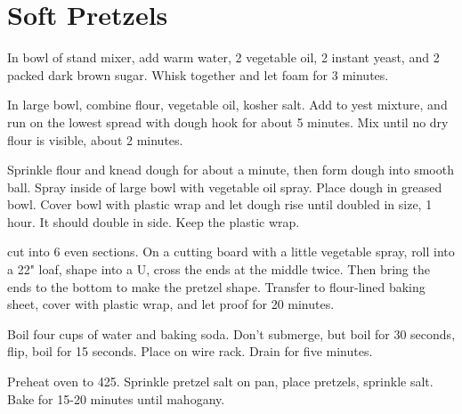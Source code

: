\section{Soft Pretzels}
\begin{recipe}



 In bowl of stand mixer, add  \cup warm water, 2 \T vegetable oil, 2 \tsp instant yeast, and 2 \T packed dark brown sugar.  Whisk together and let foam for 3 minutes.

In large bowl, combine flour, vegetable oil, kosher salt. Add to yest mixture, and run on the lowest spread with dough hook for about 5 minutes. Mix until no dry flour is visible, about 2 minutes.

Sprinkle flour and knead dough for about a minute, then form dough into smooth ball. Spray inside of large bowl with vegetable oil spray. Place dough in greased bowl. Cover bowl with plastic wrap and let dough rise until doubled in size, 1 hour. It should double in side. Keep the plastic wrap.

 cut into 6 even sections. On a cutting board with a little vegetable spray, roll into a 22" loaf, shape into a U, cross the ends at the middle twice. Then bring the ends to the bottom to make the pretzel shape. Transfer to flour-lined baking sheet, cover with plastic wrap, and let proof for 20 minutes.

Boil four cups of water and  \cup baking soda. Don't submerge, but boil for 30 seconds, flip, boil for 15 seconds. Place on wire rack. Drain for five minutes.

Preheat oven to 425. Sprinkle pretzel salt on pan, place pretzels, sprinkle salt. Bake for 15-20 minutes until mahogany.

\end{recipe}
